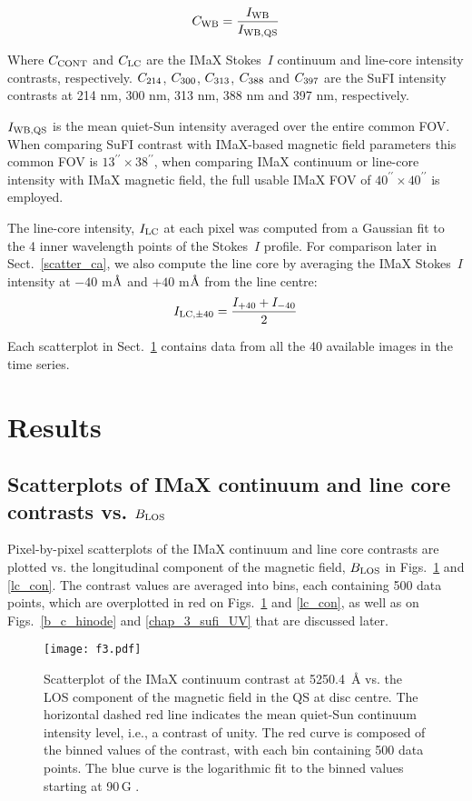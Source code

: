 \documentclass[goettingen, gauss, print]{thesis}
\begin{document}
\begin{equation}
C_{\rm WB} = \frac{I_{\rm WB}}{I_{\rm WB, QS}}
\end{equation}

Where $C_{\rm CONT}$ and $C_{\rm LC}$ are the IMaX Stokes~$I$ continuum and line-core intensity contrasts, respectively. $C_{\rm 214}$, $C_{\rm 300}$, $C_{\rm 313}$, $C_{\rm 388}$ and $C_{\rm 397}$ are the SuFI intensity contrasts at 214 nm, 300 nm, 313 nm, 388 nm and 397 nm, respectively.

$I_{\rm WB, QS}$ is the mean quiet-Sun intensity averaged over the entire common FOV. When comparing SuFI contrast with IMaX-based magnetic field parameters this common FOV is $13^{\prime\prime}\times38^{\prime\prime}$, when comparing IMaX continuum or line-core intensity with IMaX magnetic field, the full usable IMaX FOV of $40^{\prime\prime}\times40^{\prime\prime}$ is employed.

The line-core intensity, $I_{\rm LC}$ at each pixel was computed from a Gaussian fit to the 4 inner wavelength points of the Stokes~$I$ profile. For comparison later in Sect.~\ref{scatter_ca}, we also compute the line core  by averaging the IMaX Stokes~$I$ intensity at $-40$ m${\textup{\AA}}$ and $+40$ m${\textup{\AA}}$ from the line centre:
\begin{equation}
I_{\rm LC,\pm 40} = \frac{I_{+40}+ I_{-40}}{2}
\label{LC_40}
\end{equation}

Each scatterplot in Sect.~\ref{plots} contains data from all the 40 available images in the time series.


\section{Results}
\label{plots}
\subsection{Scatterplots of IMaX continuum and line core contrasts vs. $B_{\rm LOS}$}
\label{plots_b_c}
Pixel-by-pixel scatterplots of the IMaX continuum and line core contrasts are plotted vs. the longitudinal component of the magnetic field, $B_{\rm LOS}$ in Figs.~\ref{cont_con} and \ref{lc_con}. The contrast values are averaged into bins, each containing 500 data points, which are overplotted in red on Figs.~\ref{cont_con} and \ref{lc_con}, as well as on Figs.~\ref{b_c_hinode} and \ref{chap_3_sufi_UV} that are discussed later.

\begin{figure}[!h]
\centering
\texttt{[image: f3.pdf]}
\caption{Scatterplot of the IMaX continuum contrast at 5250.4\, \AA{} vs. the LOS component of the magnetic field in the QS at disc centre. The horizontal dashed red line indicates the mean quiet-Sun continuum intensity level, i.e., a contrast of unity. The red curve is composed of the binned values of the contrast, with each bin containing 500 data points. The blue curve is the logarithmic fit to the binned values starting at 90\,G . }
\label{cont_con}
\end{figure}
\end{document}
